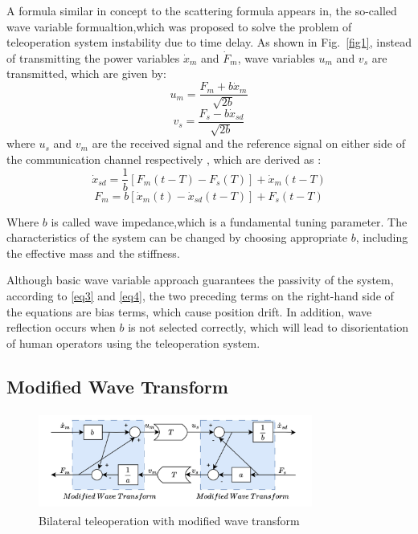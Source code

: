 A formula similar in concept to the scattering formula appears in\cite{b13},
the so-called wave variable formualtion,which was proposed to solve the problem of
teleoperation system instability due to time  delay.
As shown in Fig.~\ref{fig1},
instead of transmitting the power variables  $\dot x_m$ and $\dot F_m$,
wave variables  $u_m$ and $v_s$ are transmitted,
which are given by:
\begin{equation}
    u_m = \frac{F_m + b \dot x_m}{\sqrt{2b}}\label{eq1}
\end{equation}
\begin{equation}
    v_s = \frac{F_s - b \dot x_{sd}}{\sqrt{2b}}\label{eq2}
\end{equation}
where $u_s$ and $v_m$ are the received signal
and the reference signal on either 
side of the communication channel respectively
, which are derived as
:
\begin{equation}
    \dot x_{sd}=\frac{1}{b}\left[F_m(t-T)-F_s(T)\right]+\dot x_m(t-T)\label{eq3}
\end{equation}
\begin{equation}
    F_{m}=b\left[\dot x_m(t)-\dot x_{sd}(t-T)\right]+F_s(t-T)\label{eq4}
\end{equation}

Where $b$ is called wave impedance,which is a fundamental tuning parameter.
The characteristics of the system can be changed
by choosing appropriate $b$, including the effective mass and the
stiffness.

\par Although basic wave variable approach guarantees the passivity of the system\cite{b14},
according to \eqref{eq3} and \eqref{eq4},
the two preceding terms on the right-hand side of the equations are bias terms, which cause position drift.
In addition, wave reflection occurs when $b$ is not selected correctly\cite{b7},
which will lead to disorientation of human operators using the teleoperation system.

\subsection{Modified Wave Transform}
\begin{figure}[htbp]
    \centerline{\includegraphics[height=3.2cm,width=9cm]{2019.jpg}}
    \caption{Bilateral teleoperation with modified wave transform}
    \label{fig2}
\end{figure}

